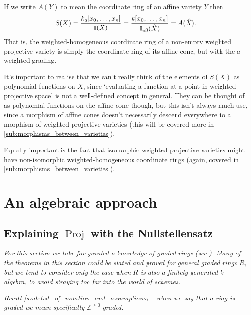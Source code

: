 \documentclass[10pt,notitlepage]{article}
\numberwithin{equation}{subsection}
\DeclareMathOperator{\proj}{Proj}
\DeclareMathOperator{\ide}{\mathbb{I}}
\DeclareMathOperator{\ideaff}{\mathbb{I}_{\textnormal{aff}}}
\newcommand{\zz}{\mathbb{Z}}
\newcommand{\kazn}{k_a[x_0,\ldots,x_n]}
\newcommand{\kzn}{k[x_0,\ldots,x_n]}
\begin{document}
    If we write $A(Y)$ to mean the coordinate ring of an affine variety $Y$ then
    \[
        S(X) = \frac{\kazn}{\ide(X)} = \frac{\kzn}{\ideaff(\hat{X})} = A(\hat{X}).
    \]
    That is, the weighted-homogeneous coordinate ring of a non-empty weighted projective variety is simply the coordinate ring of its affine cone, but with the $a$-weighted grading.

    It's important to realise that we can't really think of the elements of $S(X)$ as polynomial functions on $X$, since `evaluating a function at a point in weighted projective space' is not a well-defined concept in general.
    They can be thought of as polynomial functions on the affine cone though, but this isn't always much use, since a morphism of affine cones doesn't necessarily descend everywhere to a morphism of weighted projective varieties (this will be covered more in \cref{sub:morphisms_between_varieties}).

    Equally important is the fact that isomorphic weighted projective varieties might have non-isomorphic weighted-homogeneous coordinate rings (again, covered in \cref{sub:morphisms_between_varieties}).
    





\section{An algebraic approach} %
\label{sec:algebra}



    \subsection{Explaining \texorpdfstring{$\proj$}{Proj} with the Nullstellensatz} %
    \label{sub:explaining_}

    \emph{For this section we take for granted a knowledge of graded rings (see \cite[Chapter~6]{Agrawal:uf}).}
    \emph{Many of the theorems in this section could be stated and proved for general graded rings $R$, but we tend to consider only the case when $R$ is also a finitely-generated $k$-algebra, to avoid straying too far into the world of schemes.}

    \emph{Recall \cref{ssub:list_of_notation_and_assumptions} -- when we say that a ring is graded we mean specifically $\zz^{\geqslant0}$-graded.}
\end{document}
